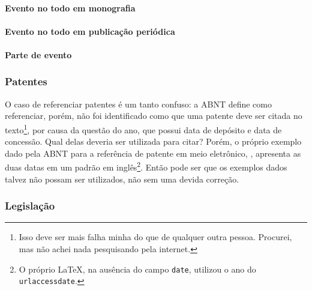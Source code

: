 \paragraph{Evento no todo em monografia}



\paragraph{Evento no todo em publicação periódica}

\paragraph{Parte de evento}



\subsubsection{Patentes}
O caso de referenciar patentes é um tanto confuso: a ABNT define como referenciar, porém, não foi identificado como que uma patente deve ser citada no texto\footnote{Isso deve ser mais falha minha do que de qualquer outra pessoa. Procurei, mas não achei nada pesquisando pela internet.}, por causa da questão do ano, que possui data de depósito e data de concessão. Qual delas deveria ser utilizada para citar? Porém, o próprio exemplo dado pela ABNT para a referência de patente em meio eletrônico, \cite{patente:eletronico}, apresenta as duas datas em um padrão em inglês\footnote{O próprio \LaTeX, na ausência do campo \texttt{date}, utilizou o ano do \texttt{urlaccessdate}.}. Então pode ser que os exemplos dados talvez não possam ser utilizados, não sem uma devida correção.




\subsubsection{Legislação}

